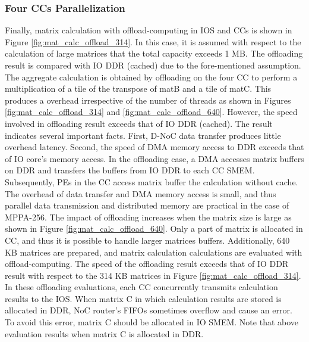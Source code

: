 \documentclass{sig-alternate-05-2015}
\begin{document}
\subsubsection{Four CCs Parallelization}
\label{sec:four_CCs}
Finally, matrix calculation with offload-computing in IOS and CCs is shown in Figure \ref{fig:mat_calc_offload_314}.
In this case, it is assumed with respect to the calculation of large matrices that the total capacity exceeds 1 MB.
The offloading result is compared with IO DDR (cached) due to the fore-mentioned assumption.
The aggregate calculation is obtained by offloading on the four CC to perform a multiplication of a tile of the transpose of matB and a tile of matC.
This produces a overhead irrespective of the number of threads as shown in Figures \ref{fig:mat_calc_offload_314} and \ref{fig:mat_calc_offload_640}.
However, the speed involved in offloading result exceeds that of IO DDR (cached).
The result indicates several important facts.
First, D-NoC data transfer produces little overhead latency.
Second, the speed of DMA memory access to DDR exceeds that of IO core's memory access.
In the offloading case, a DMA accesses matrix buffers on DDR and transfers the buffers from IO DDR to each CC SMEM.
Subsequently, PEs in the CC access matrix buffer the calculation without cache.
The overhead of data transfer and DMA memory access is small, and thus parallel data transmission and distributed memory are practical in the case of MPPA-256.
The impact of offloading increases when the matrix size is large as shown in Figure \ref{fig:mat_calc_offload_640}.
Only a part of matrix is allocated in CC, and thus it is possible to handle larger matrices buffers.
Additionally, 640 KB matrices are prepared, and matrix calculation calculations are evaluated with offload-computing.
The speed of the offloading result exceeds that of IO DDR result with respect to the 314 KB matrices in Figure \ref{fig:mat_calc_offload_314}.
In these offloading evaluations, each CC concurrently transmits calculation results to the IOS.
When matrix C in which calculation results are stored is allocated in DDR, NoC router's FIFOs sometimes overflow and cause an error.
To avoid this error, matrix C should be allocated in IO SMEM.
Note that above evaluation results when matrix C is allocated in DDR.
\end{document}
